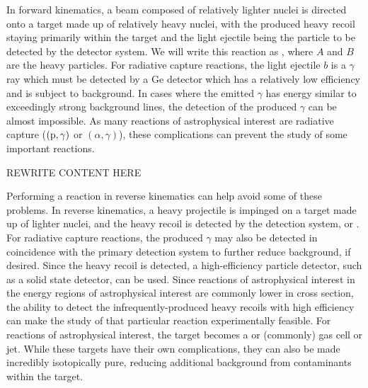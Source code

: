 In forward kinematics, a beam composed of relatively lighter nuclei is
directed onto a target made up of relatively heavy nuclei, with the
produced heavy recoil staying primarily within the target and the light
ejectile being the particle to be detected by the detector system. We
will write this reaction as , where $A$ and $B$ are
the heavy particles. For radiative capture reactions, the light ejectile
$b$ is a $\gamma$ ray which must be detected by a Ge detector which has
a relatively low efficiency and is subject to background. In cases where
the emitted $\gamma$ has energy similar to exceedingly strong background
lines, the detection of the produced $\gamma$ can be almost impossible.
As many reactions of astrophysical interest are radiative capture
($(\rm{p},\gamma)$ or $(\alpha,\gamma)$), these complications can
prevent the study of some important reactions.

REWRITE CONTENT HERE

Performing a reaction in reverse kinematics can help avoid some of these
problems. In reverse kinematics, a heavy projectile is impinged on a
target made up of lighter nuclei, and the heavy recoil is detected by
the detection system, or . For radiative capture
reactions, the produced $\gamma$ may also be detected in coincidence
with the primary detection system to further reduce background, if
desired. Since the heavy recoil is detected, a high-efficiency particle
detector, such as a solid state detector, can be used. Since reactions
of astrophysical interest in the energy regions of astrophysical
interest are commonly lower in cross section, the ability to detect the
infrequently-produced heavy recoils with high efficiency can make the
study of that particular reaction experimentally feasible. For reactions
of astrophysical interest, the target becomes a  or
 (commonly) gas cell or jet. While these targets have their
own complications, they can also be made incredibly isotopically pure,
reducing additional background from contaminants within the target.

